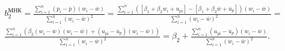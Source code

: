 \documentclass[a4paper,12pt]{article}
\begin{document}
\begin{multline}
  b_2^\text{МНК} =
  \frac{\sum\limits_{i=1}^{n}(p_i-\overline{p})(w_i-\overline{w})}{\sum\limits_{i=1}^{n}(w_i-\overline{w})^2} =
  \frac{\sum\limits_{i=1}^{n}([\beta_1+\beta_2w_i+u_\mathrm{pi}]-[\beta_1+\beta_2\overline{w}+\overline{u}_p])(w_i-\overline{w})}{\sum\limits_{i=1}^{n}(w_i-\overline{w})^2} = \\
  \frac{\sum\limits_{i=1}^{n}(\beta_2(w_i-\overline{w})(w_i-\overline{w})+(u_\mathrm{pi}-\overline{u}_p)(w_i - \overline{w}))}{\sum\limits_{i=1}^{n}(w_i-\overline{w})^2} =
  \beta_2 + \frac{\sum\limits_{i=1}^{n}(u_\mathrm{pi}-\overline{u}_p)(w_i-\overline{w})}{\sum\limits_{i=1}^{n}(w_i-\overline{w})^2}. \\
\end{multline}
\end{document}
